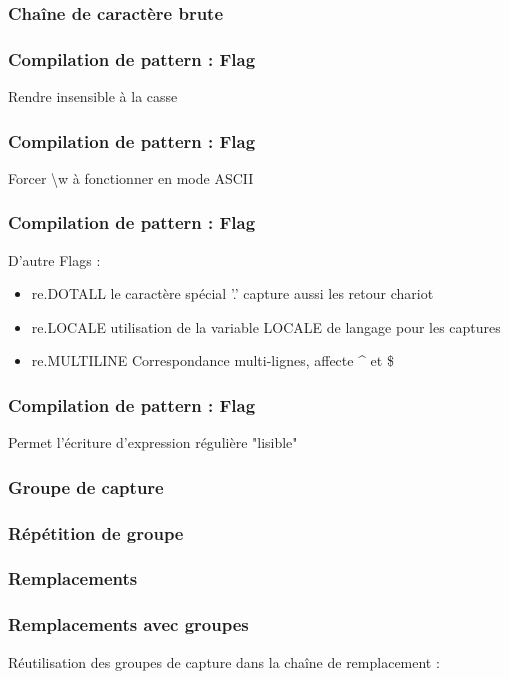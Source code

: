 \begin{frame}
  \frametitle{Chaîne de caractère brute}
\end{frame}

\begin{frame}
  \frametitle{Compilation de pattern : Flag}
  Rendre insensible à la casse
\end{frame}

\begin{frame}
  \frametitle{Compilation de pattern : Flag}
  Forcer \textbackslash w à fonctionner en mode ASCII
\end{frame}

\begin{frame}
  \frametitle{Compilation de pattern : Flag}
  D'autre Flags :
  \begin{itemize}
  \item re.DOTALL le caractère spécial '.' capture aussi les retour chariot
  \item re.LOCALE utilisation de la variable LOCALE de langage pour les captures
  \item re.MULTILINE Correspondance multi-lignes, affecte \^{} et \$
  \end{itemize}
\end{frame}

\begin{frame}
  \frametitle{Compilation de pattern : Flag}
  Permet l'écriture d'expression régulière "lisible"
\end{frame}

\begin{frame}
  \frametitle{Groupe de capture}
\end{frame}

\begin{frame}
  \frametitle{Répétition de groupe}
\end{frame}

\begin{frame}
  \frametitle{Remplacements}
\end{frame}

\begin{frame}
  \frametitle{Remplacements avec groupes}
  Réutilisation des groupes de capture dans la chaîne de remplacement :
\end{frame}

